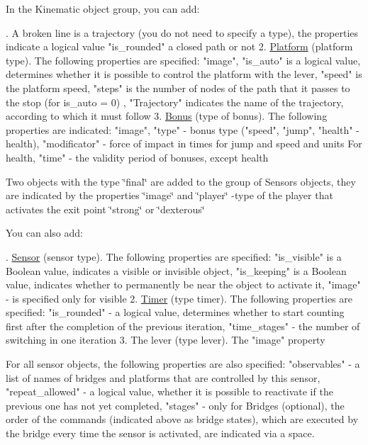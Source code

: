 In the Kinematic object group, you can add\+:


\begin{DoxyPre}{. A broken line is a trajectory (you do not need to specify a type), the properties indicate a logical value "is\_rounded" a closed path or not
    2. \hyperlink{class_platform}{Platform} (platform type). The following properties are specified: "image", "is\_auto" is a logical value, determines whether it is possible to control the platform with the lever, "speed" is the platform speed, "steps" is the number of nodes of the path that it passes to the stop (for is\_auto = 0) , "Trajectory" indicates the name of the trajectory, according to which it must follow
    3. \hyperlink{class_bonus}{Bonus} (type of bonus). The following properties are indicated: "image", "type" - bonus type ("speed", "jump", "health" - health), "modificator" - force of impact in times for jump and speed and units For health, "time" - the validity period of bonuses, except health
}\end{DoxyPre}


Two objects with the type \char`\"{}final\char`\"{} are added to the group of Sensors objects, they are indicated by the properties \char`\"{}image\char`\"{} and \char`\"{}player\char`\"{} -\/type of the player that activates the exit point \char`\"{}strong\char`\"{} or \char`\"{}dexterous\char`\"{}


\begin{DoxyPre}{\ttfamily You can also add:}\end{DoxyPre}



\begin{DoxyPre}{. \hyperlink{class_sensor}{Sensor} (sensor type). The following properties are specified: "is\_visible" is a Boolean value, indicates a visible or invisible object, "is\_keeping" is a Boolean value, indicates whether to permanently be near the object to activate it, "image" - is specified only for visible
    2. \hyperlink{class_timer}{Timer} (type timer). The following properties are specified: "is\_rounded" - a logical value, determines whether to start counting first after the completion of the previous iteration, "time\_stages" - the number of switching in one iteration
    3. The lever (type lever). The "image" property}\end{DoxyPre}



\begin{DoxyPre}{\ttfamily For all sensor objects, the following properties are also specified: "observables" - a list of names of bridges and platforms that are controlled by this sensor, "repeat\_allowed" - a logical value, whether it is possible to reactivate if the previous one has not yet completed, "stages" - only for Bridges (optional), the order of the commands (indicated above as bridge states), which are executed by the bridge every time the sensor is activated, are indicated via a space.
}\end{DoxyPre}


